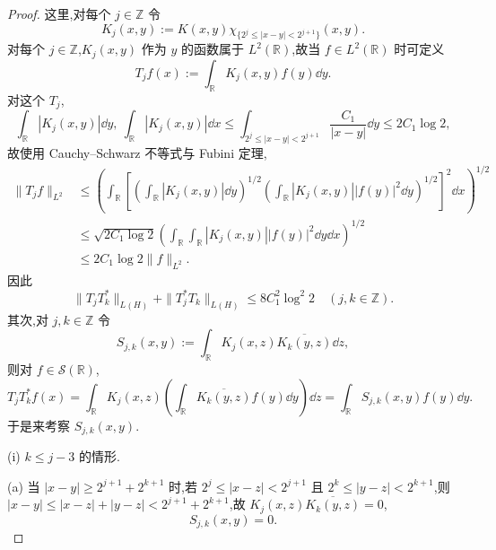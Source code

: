 \begin{proof}
这里,对每个 $j \in \mathbb{Z}$ 令
\begin{equation*}
K_{j}(x, y) := K(x, y)\chi_{\{2^{j} \leq |x - y| < 2^{j+1}\}}(x, y).
\end{equation*}
对每个 $j \in \mathbb{Z}$,$K_{j}(x, y)$ 作为 $y$ 的函数属于 $L^{2}(\mathbb{R})$,故当 $f \in L^{2}(\mathbb{R})$ 时可定义
\begin{equation}\tag{1.10.9}
T_{j}f(x) := \int_{\mathbb{R}}K_{j}(x, y)f(y)\dd y.
\label{eq:1.10.9}\end{equation}
对这个 $T_{j}$,
\begin{equation}\tag{1.10.10}
\int_{\mathbb{R}}|K_{j}(x, y)|\dd y,\ \int_{\mathbb{R}}|K_{j}(x, y)|\dd x \leq \int_{2^{j} \leq |x - y| < 2^{j+1}}\frac{C_{1}}{|x - y|}\dd y \leq 2C_{1}\log 2,
\label{eq:1.10.10}\end{equation}
故使用 Cauchy--Schwarz 不等式与 Fubini 定理,
\begin{align*}
\| T_{j}f \|_{L^{2}}&\leq \left(\displaystyle\int_{\mathbb{R}}\left[\left(\int_{\mathbb{R}}|K_{j}(x, y)|\dd y\right)^{1/2}\left(\int_{\mathbb{R}}|K_{j}(x, y)||f(y)|^{2}\dd y\right)^{1/2}\right]^{2}\dd x\right)^{1/2}  \\
&\leq \sqrt{2C_{1}\log 2}\left(\displaystyle\int_{\mathbb{R}}\int_{\mathbb{R}}|K_{j}(x, y)||f(y)|^{2}\dd y\dd x\right)^{1/2} \\
&\leq 2C_{1}\log 2\| f \|_{L^{2}}.
\end{align*}
因此
\begin{equation}\tag{1.10.11}
\| T_{j}T_{k}^{*} \|_{L(H)} + \| T_{j}^{*}T_{k} \|_{L(H)} \leq 8C_{1}^{2}\log^{2}2 \quad (j, k \in \mathbb{Z}).
\label{eq:1.10.11}\end{equation}
其次,对 $j, k \in \mathbb{Z}$ 令
\begin{equation*}
S_{j,k}(x, y) := \int_{\mathbb{R}}K_{j}(x, z)\overline{K_{k}(y, z)}\dd z,
\end{equation*}
则对 $f \in \mathcal{S}(\mathbb{R})$,
\begin{equation*}
T_{j}T_{k}^{*}f(x) = \int_{\mathbb{R}}K_{j}(x, z)\left(\int_{\mathbb{R}}\overline{K_{k}(y, z)}f(y)\dd y\right)\dd z = \int_{\mathbb{R}}S_{j,k}(x, y)f(y)\dd y.
\end{equation*}
于是来考察 $S_{j,k}(x, y)$.

(i) $k \leq j - 3$ 的情形.

(a) 当 $|x - y| \geq 2^{j+1} + 2^{k+1}$ 时,若 $2^{j} \leq |x - z| < 2^{j+1}$ 且 $2^{k} \leq |y - z| < 2^{k+1}$,则 $|x - y| \leq |x - z| + |y - z| < 2^{j+1} + 2^{k+1}$,故 $K_{j}(x, z)\overline{K_{k}(y, z)} = 0$,
\begin{equation*}
S_{j,k}(x, y) = 0.
\end{equation*}


\end{proof}

